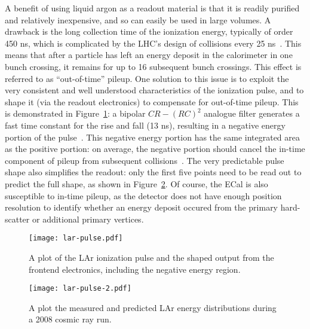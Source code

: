 A benefit of using liquid argon as a readout material is that it is readily purified and relatively inexpensive, and so can easily be used in large volumes. A drawback is the long collection time of the ionization energy, typically of order 450 ns, which is complicated by the LHC's design of collisions every 25 ns~\cite{ATLASPaper,LARPaper}. This means that after a particle has left an energy deposit in the calorimeter in one bunch crossing, it remains for up to 16 subsequent bunch crossings. This effect is referred to as ``out-of-time'' pileup. One solution to this issue is to exploit the very consistent and well understood characteristics of the ionization pulse, and to shape it (via the readout electronics) to compensate for out-of-time pileup. This is demonstrated in Figure~\ref{fig:detector:lar-pulse}: a bipolar $CR -(RC)^2$ analogue filter generates a fast time constant for the rise and fall (13 ns), resulting in a negative energy portion of the pulse~\cite{LARPaper}. This negative energy portion has the same integrated area as the positive portion: on average, the negative portion should cancel the in-time component of pileup from subsequent collisions~\cite{Loch}. The very predictable pulse shape also simplifies the readout: only the first five points need to be read out to predict the full shape, as shown in Figure~\ref{fig:detector:lar-pulse-2}. Of course, the ECal is also susceptible to in-time pileup, as the detector does not have enough position resolution to identify whether an energy deposit occured from the primary hard-scatter or additional primary vertices.


\begin{figure}
\centering
\texttt{[image: lar-pulse.pdf]}
\label{fig:detector:lar-pulse}
\caption{A plot of the LAr ionization pulse and the shaped output from the frontend electronics, including the negative energy region.}
\end{figure}



\begin{figure}
\centering
\texttt{[image: lar-pulse-2.pdf]}
\label{fig:detector:lar-pulse-2}
\caption{A plot the measured and predicted LAr energy distributions during a 2008 cosmic ray run.}
\end{figure}


